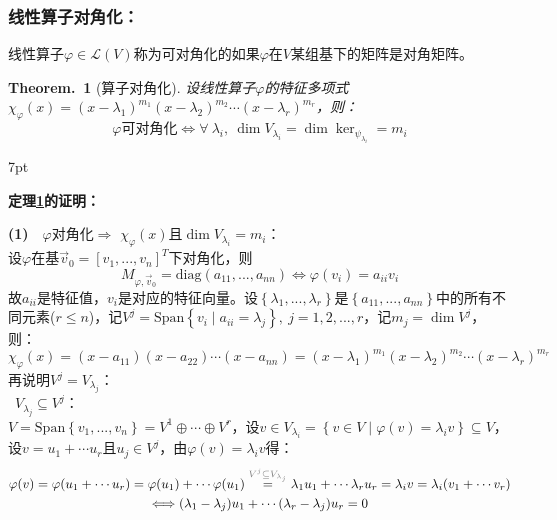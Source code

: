 \documentclass[zihao=5,UTF8]{report}
\theoremstyle{mystyle} %
\newtheorem{theorem}{Theorem.\,}
\newenvironment{graybox}{%
\def\FrameCommand{%
\hspace{1pt}%
{\color{gray}\small \vrule width 2pt}%
{\color{graybox_color}\vrule width 4pt}%
\colorbox{graybox_color}%
}%
\MakeFramed{\advance\hsize-\width\FrameRestore}%
\noindent\hspace{-4.55pt}%
\begin{adjustwidth}{}{7pt}%
\vspace{2pt}\vspace{2pt}%
}
{%
\vspace{2pt}\end{adjustwidth}\endMakeFramed%
}
\begin{document}
\subsubsection{线性算子对角化：}
线性算子$\varphi \in \mathscr{L}(V)$称为可对角化的如果$\varphi$在$V$某组基下的矩阵是对角矩阵。
\begin{theorem}[算子对角化]\label{线性算子对角化}
设线性算子$\varphi$的特征多项式$\chi_{\varphi}(x) = (x-\lambda_1)^{m_1}(x-\lambda_2)^{m_2} \cdots (x-\lambda_r)^{m_r}$，则：
\begin{equation*}
   \text{$\varphi$可对角化} \Longleftrightarrow \forall\ \lambda_i,\ \dim V_{\lambda_i} = \dim \ker_{\psi_{\lambda_i}}= m_i 
\end{equation*}
\end{theorem}
\begin{graybox}
\textbf{定理\ref{线性算子对角化}的证明：}\par
\noindent \textbf{(1)}\ \ $\varphi$对角化$\Longrightarrow$ $\chi_{\varphi}(x)$且$\dim V_{\lambda_i} = m_i$：\\
设$\varphi$在基$\vec{v}_0 = [v_1,...,v_n]^T$下对角化，则
\begin{equation*}
    M_{\varphi,\vec{v}_0} = \text{diag}(a_{11},...,a_{nn}) \Longleftrightarrow \varphi(v_i) = a_{ii}v_i 
\end{equation*}
故$a_{ii}$是特征值，$v_i$是对应的特征向量。设$\left\{\lambda_1,...,\lambda_r\right\}$是$\left\{a_{11},...,a_{nn}\right\}$中的所有不同元素($r\le n$)，记$V^j = \text{Span} \left\{ v_i \mid a_{ii} = \lambda_j\right\},\ j = 1,2,...,r$，记$m_j = \dim V^j$，则：
\begin{equation*}
    \chi_{\varphi}(x) = (x-a_{11})(x-a_{22}) \cdots (x-a_{nn}) = (x-\lambda_1)^{m_1}(x-\lambda_2)^{m_2} \cdots (x-\lambda_r)^{m_r}
\end{equation*}
再说明$V^j = V_{\lambda_j}$：\\
\ $V_{\lambda_j} \subseteq V^j$：\\
$V = \text{Span} \left\{v_1,...,v_n\right\} = V^1 \oplus \cdots \oplus V^r$，设$v \in V_{\lambda_i} = \left\{v \in V\mid \varphi(v) = \lambda_iv\right\} \subseteq V$，设$v = u_1 + \cdots u_r$且$u_j \in V^j$，由$\varphi(v) = \lambda_i v$得：
\begin{gather*}
    \varphi(v) =\varphi(u_1 + \cdots u_r) = \varphi(u_1) + \cdots \varphi(u_1) 
    \overset{\textcolor{gray}{V^j\subseteq V_{\lambda_j}} }{=} \lambda_1u_1 + \cdots \lambda_ru_r =\lambda_iv = \lambda_i(v_1 + \cdots v_r) \\
    \Longleftrightarrow  (\lambda_1- \lambda_j)u_1 + \cdots (\lambda_r -\lambda_j)u_r = 0

\end{gather*}
\end{graybox}
\end{document}
